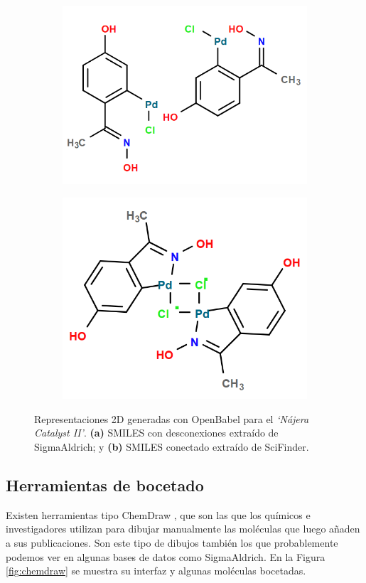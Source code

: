 \begin{figure}[h!]
\centering
\begin{subfigure}{.5\textwidth}
  \centering
  \includegraphics[width=.9\linewidth, frame]{imagenes/estado_arte/dotted_SA.png}
  \caption{}
\end{subfigure}%
\begin{subfigure}{.5\textwidth}
  \centering
  \includegraphics[width=.8\linewidth, frame]{imagenes/estado_arte/not_dotted_SF.png}
  \caption{}
\end{subfigure}
\caption{Representaciones 2D generadas con OpenBabel para el \emph{`Nájera Catalyst II'}. \textbf{(a)} SMILES con desconexiones extraído de SigmaAldrich; y \textbf{(b)} SMILES conectado extraído de SciFinder.}
\label{fig:dotted_smiles_vs_complete}
\end{figure}


\subsection{Herramientas de bocetado}
Existen herramientas tipo ChemDraw \cite{chemdraw_page}, que son las que los químicos e investigadores utilizan para dibujar manualmente las moléculas que luego añaden a sus publicaciones. Son este tipo de dibujos también los que probablemente podemos ver en algunas bases de datos como SigmaAldrich. En la Figura \ref{fig:chemdraw} se muestra su interfaz y algunas moléculas bocetadas.

